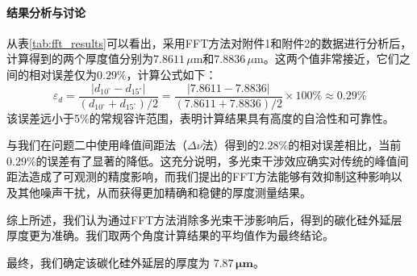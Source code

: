 \documentclass[withoutpreface,bwprint]{cumcmthesis} %
\begin{document}
\paragraph{结果分析与讨论}
从表\ref{tab:fft_results}可以看出，采用FFT方法对附件1和附件2的数据进行分析后，计算得到的两个厚度值分别为$7.8611\,\mu\text{m}$和$7.8836\,\mu\text{m}$。这两个值非常接近，它们之间的相对误差仅为$0.29\%$，计算公式如下：
$$ \varepsilon_d = \frac{|d_{10^\circ} - d_{15^\circ}|}{(d_{10^\circ} + d_{15^\circ})/2} = \frac{|7.8611 - 7.8836|}{(7.8611 + 7.8836)/2} \times 100\% \approx 0.29\% $$
该误差远小于5\%的常规容许范围，表明计算结果具有高度的自洽性和可靠性。

与我们在问题二中使用峰值间距法（$\Delta\nu$法）得到的$2.28\%$的相对误差相比，当前$0.29\%$的误差有了显著的降低。这充分说明，多光束干涉效应确实对传统的峰值间距法造成了可观测的精度影响，而我们提出的FFT方法能够有效抑制这种影响以及其他噪声干扰，从而获得更加精确和稳健的厚度测量结果。

综上所述，我们认为通过FFT方法消除多光束干涉影响后，得到的碳化硅外延层厚度更为准确。我们取两个角度计算结果的平均值作为最终结论。

最终，我们确定该碳化硅外延层的厚度为 $\mathbf{7.87\,\mu m}$。
\end{document}
